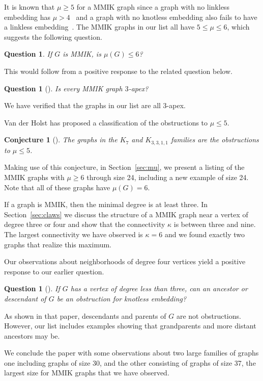 \documentclass{amsart}
\newtheorem{conjecture}[theorem]{Conjecture}
\newtheorem{question}[theorem]{Question}
\theoremstyle{remark}
\begin{document}
{ It is known that $\mu \geq 5$ for a MMIK graph since a graph with no linkless embedding has $\mu > 4$~\cite{LS} and a graph
with no knotless embedding also fails to have a linkless embedding~\cite{RST}. The MMIK graphs in our list all have $5 \leq \mu \leq 6$,
which suggests the following question.
\begin{question}
\label{ques:mu6}
If $G$ is MMIK, is $\mu(G) \leq 6$?
\end{question}
This would follow from a positive response to the related question below.
\begin{question}[\cite{BM}]
\label{que:3apex}
Is every MMIK graph $3$-apex?
\end{question}
We have verified that the graphs in our list are all $3$-apex.

Van der Holst has proposed a classification of the obstructions to $\mu \leq 5$.
\begin{conjecture}[\cite{vdH}]
\label{con:vdH}
The graphs in the $K_7$ and $K_{3,3,1,1}$ families are the obstructions to $\mu \leq 5$.
\end{conjecture}
Making use of this conjecture, in Section~\ref{sec:mu}, we present a listing of the MMIK graphs with $\mu \geq 6$ through size 24,
including a new example of size 24. Note that all of these graphs have $\mu(G) = 6$.

If a graph is MMIK, then the minimal degree is at least three. 
In Section~\ref{sec:claws}
we discuss the structure of a MMIK graph near a vertex of degree three or four and show that the
connectivity $\kappa$ is between three and nine.
The largest connectivity we have observed is $\kappa = 6$ and we found exactly
two graphs that realize this maximum. 

Our observations about neighborhoods of degree four vertices yield a positive response to our earlier question.

\begin{question}[\cite{KM}]
\label{que:d3MMIK}
If $G$ has a vertex of degree less than three, can an ancestor or descendant of $G$ be an obstruction
for knotless embedding?
\end{question}

As shown in that paper, descendants and parents of $G$ are not obstructions. However, our list includes examples showing that 
grandparents and more distant ancestors may be.

We conclude the paper with some observations about two large families of graphs one including graphs of size 30, and the other consisting of graphs of size 37, the largest size for MMIK graphs that we have observed.

}
\end{document}
